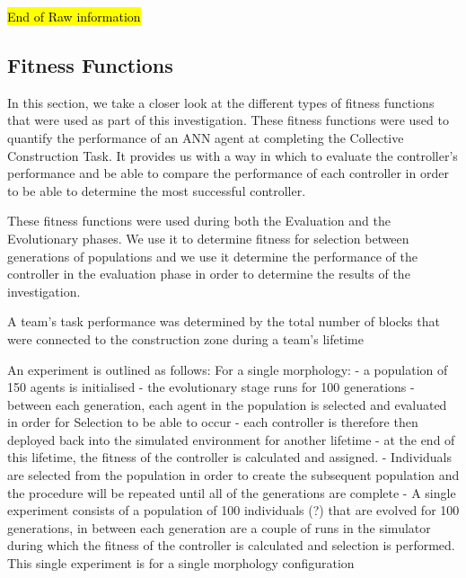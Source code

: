 \documentclass[conference]{IEEEtran}
\begin{document}
\hl{End of Raw information}

\subsection{Fitness Functions}
In this section, we take a closer look at the different types of fitness functions that were used as part of this investigation. These fitness functions were used to quantify the performance of an ANN agent at completing the Collective Construction Task.
It provides us with a way in which to evaluate the controller's performance and be able to compare the performance of each controller in order to be able to determine the most successful controller.

These fitness functions were used during both the Evaluation and the Evolutionary phases. We use it to determine fitness for selection between generations of populations and we use it determine the performance of the controller in the evaluation phase in order to determine the results of the investigation.

A team's task performance was determined by the total number of blocks that were connected to the construction zone during a team's lifetime

An experiment is outlined as follows:
For a single morphology:
	- a population of 150 agents is initialised
	- the evolutionary stage runs for 100 generations
	- between each generation, each agent in the population is selected and evaluated in order for Selection to be able to occur
		- each controller is therefore then deployed back into the simulated environment for another lifetime
		- at the end of this lifetime, the fitness of the controller is calculated and assigned.
		- Individuals are selected from the population in order to create the subsequent population and the procedure will be repeated until all of the generations are complete
	- A single experiment consists of a population of 100 individuals (?) that are evolved for 100 generations, in between each generation are a couple of runs in the simulator during which the fitness of the controller is calculated and selection is performed. This single experiment is for a single morphology configuration 
	
\end{document}
